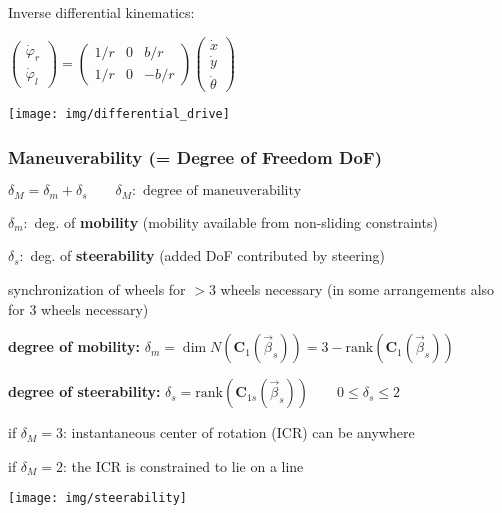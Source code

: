 \documentclass[fontsize=6pt]{scrartcl}
\newcommand{\mat}[1]{\mathbf{#1}}
\begin{document}
\begin{multicols*}{4}
\begin{minipage}{0.65\linewidth}
Inverse differential kinematics:

$
\begin{pmatrix}
\dot\varphi_r\\
\dot{\varphi}_l
\end{pmatrix}
=
\begin{pmatrix}
1/r & 0 & b/r\\
1/r & 0 & -b/r
\end{pmatrix}
\begin{pmatrix}
\dot x\\
\dot y\\
\dot \theta
\end{pmatrix}
$
\end{minipage}
\begin{minipage}{0.35\linewidth}
\texttt{[image: img/differential\_drive]}
\end{minipage}


\subsubsection*{Maneuverability (= Degree of Freedom DoF)}
$\delta_M = \delta_m + \delta_s \qquad \delta_M: \text{ degree of maneuverability}$

$\delta_m:$ deg. of \textbf{mobility} (mobility available from non-sliding constraints)

$\delta_s:$ deg. of \textbf{steerability} (added DoF contributed by steering)

synchronization of wheels for $>3$ wheels necessary (in some arrangements also for 3 wheels necessary)

\textbf{degree of mobility:} $\delta_m = \dim N(\mat C_1(\vec \beta_s)) = 3 - \text{rank}(\mat C_1(\vec \beta_s))$

\textbf{degree of steerability:} $\delta_s = \text{rank}(\mat C_{1s}(\vec \beta_s)) \qquad 0 \leq \delta_s \leq 2$

if $\delta_M = 3$: instantaneous center of rotation (ICR) can be anywhere

if $\delta_M = 2$: the ICR is constrained to lie on a line

{\centering
\texttt{[image: img/steerability]}
\par}

%
%
%
%


\end{multicols*}
\end{document}
